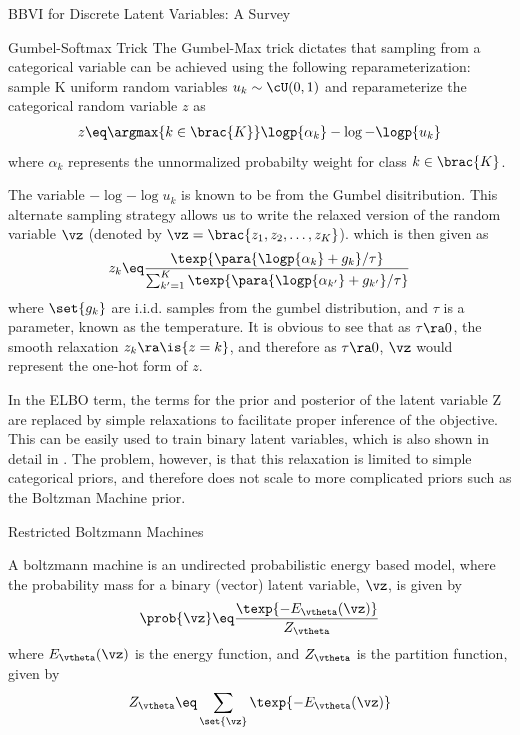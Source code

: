\documentclass{article}
\begin{document}
\begin{psection}{BBVI for Discrete Latent Variables: A Survey}
\begin{psubsection}{Gumbel-Softmax Trick}
		The Gumbel-Max trick dictates that sampling from a categorical variable can be achieved using the following reparameterization: sample K uniform random variables $u_k \sim \cU(0, 1)$ and reparameterize the categorical random variable $z$ as
		\begin{align*}
			z \eq \argmax{k \in \brac{K}} \logp{\alpha_k} - \log{-\logp{u_k}}
		\end{align*}
		where $\alpha_k$ represents the unnormalized probabilty weight for class $k \in \brac{K}$.

		The variable $-\log{-\log{u_k}}$ is known to be from the Gumbel disitribution. This alternate sampling strategy allows us to write the relaxed version of the random variable $\vz$ (denoted by $\vz = \brac{z_1, z_2, \dots, z_K}$). which is then given as
		\begin{align*}
			z_k \eq \frac{\texp{\para{\logp{\alpha_k} + g_k} / \tau}}{\sum_{k' = 1}^K \texp{\para{\logp{\alpha_{k'}} + g_{k'}} / \tau}}
		\end{align*}
		where $\set{g_k}$ are i.i.d. samples from the gumbel distribution, and $\tau$ is a parameter, known as the temperature. It is obvious to see that as $\tau \ra 0$, the smooth relaxation $z_k \ra \is{z = k}$, and therefore as $\tau \ra 0$, $\vz$ would represent the one-hot form of $z$.

		In the ELBO term, the terms for the prior and posterior of the latent variable Z are replaced by simple relaxations to facilitate proper inference of the objective. This can be easily used to train binary latent variables, which is also shown in detail in \cite{concrete}. The problem, however, is that this relaxation is limited to simple categorical priors, and therefore does not scale to more complicated priors such as the Boltzman Machine prior.

	\end{psubsection}

	\begin{psubsection}{Restricted Boltzmann Machines}

		A boltzmann machine is an undirected probabilistic energy based model, where the probability mass for a binary (vector) latent variable, $\vz$, is given by
		\begin{align}
			\prob{\vz} \eq \frac{\texp{- E_\vtheta(\vz)}}{Z_\vtheta}
			\label{eq:bm-prob}
		\end{align}
		where $E_\vtheta(\vz)$ is the energy function, and $Z_\vtheta$ is the partition function, given by
		\begin{align*}
			Z_\vtheta \eq \sum_{\set{\vz}} \texp{- E_\vtheta(\vz)}
		\end{align*}


\end{psubsection}
\end{psection}
\end{document}
